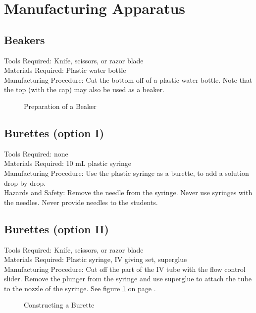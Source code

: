 \section{Manufacturing Apparatus}

\subsection*{Beakers}
Tools Required: Knife, scissors, or razor blade\\
Materials Required: Plastic water bottle\\
Manufacturing Procedure: Cut the bottom off of a plastic water bottle. Note that the top (with the cap) may also be used as a beaker.
\begin{figure}[h]
\begin{center}
\def\svgwidth{200pt}

\caption{Preparation of a Beaker}
\end{center}
\end{figure}

\subsection*{Burettes (option I)}
Tools Required: none\\
Materials Required: 10 mL plastic syringe\\
Manufacturing Procedure: Use the plastic syringe as a burette, to add a solution drop by drop.
\\Hazards and Safety: Remove the needle from the syringe. Never use syringes with the needles. Never provide needles to the students.

\subsection*{Burettes (option II)}
Tools Required: Knife, scissors, or razor blade\\
Materials Required: Plastic syringe, IV giving set, superglue\\
Manufacturing Procedure: Cut off the part of the IV tube with the flow control slider. Remove the plunger from the syringe and use superglue to attach the tube to the nozzle of the syringe. See figure \ref{fig:burette} on page \pageref{fig:burette}.


\begin{figure}[h]
\begin{center}
\caption{Constructing a Burette}
\label{fig:burette}
\end{center}
\end{figure}

